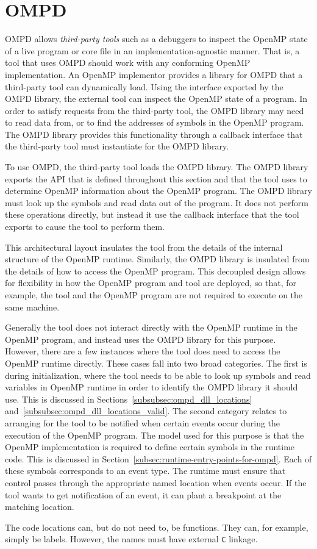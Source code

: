 \section{OMPD}
\label{sec:ompd-overview}
\label{sec:third-party-tool-callback-interface}

OMPD allows \emph{third-party tools} such as a debuggers to inspect the 
OpenMP state of a live program or core file in an implementation-agnostic 
manner. That is, a tool that uses OMPD should work with any conforming 
OpenMP implementation. An OpenMP implementor provides a library for OMPD 
that a third-party tool can dynamically load. Using the interface exported 
by the OMPD library, the external tool can inspect the OpenMP state of a 
program. In order to satisfy requests from the third-party tool, the OMPD 
library may need to read data from, or to find the addresses of symbols in 
the OpenMP program. The OMPD library provides this functionality through a 
callback interface that the third-party tool must instantiate for the OMPD library.

To use OMPD, the third-party tool loads the OMPD library. The OMPD library exports 
the API that is defined throughout this section and that the tool uses to 
determine OpenMP information about the OpenMP program. The OMPD library must
look up the symbols and read data out of the program. It does not perform
these operations directly, but instead it use the callback interface that the
tool exports to cause the tool to perform them.

This architectural layout insulates the tool from the details of the internal 
structure of the OpenMP runtime. Similarly, the OMPD library is insulated from
the details of how to access the OpenMP program. This decoupled design allows 
for flexibility in how the OpenMP program and tool are deployed, so that, for 
example, the tool and the OpenMP program are not required to execute on the 
same machine.

Generally the tool does not interact directly with the OpenMP
runtime in the OpenMP program, and instead uses the OMPD library
for this purpose.
However, there are a few instances where the tool does need
to access the OpenMP runtime directly.
These cases fall into two broad categories.
The first is during initialization, where the tool needs
to be able to look up symbols and read variables in OpenMP runtime
in order to identify the OMPD library it should use.
This is discussed in Sections~\ref{subsubsec:ompd_dll_locations}
and~\ref{subsubsec:ompd_dll_locations_valid}.
The second category relates to arranging for the tool to be notified
when certain events occur during the execution of the OpenMP program.
The model used for this purpose is that the OpenMP implementation
is required to define certain symbols in the runtime code.
This is discussed in Section~\ref{subsec:runtime-entry-points-for-ompd}.
Each of these symbols corresponds to an event type.
The runtime must ensure that control passes through the appropriate
named location when events occur.
If the tool wants to get notification of an event, it can plant
a breakpoint at the matching location.

The code locations can, but do not need to, be functions.
They can, for example, simply be labels.
However, the names must have external \texttt{C} linkage.

